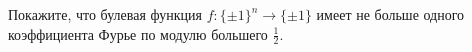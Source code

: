 Покажите, что булевая функция $f\colon \{\pm 1\}^n \to \{\pm 1\}$ имеет не больше одного коэффициента
Фурье по модулю большего $\frac{1}{2}$.